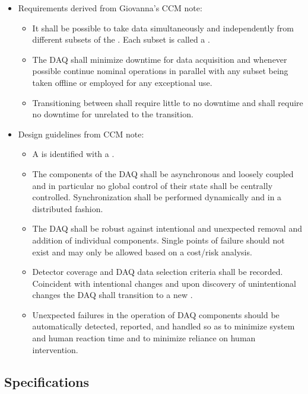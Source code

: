 \begin{itemize}
\item Requirements derived from Giovanna's CCM note:
  \begin{itemize}
  \item It shall be possible to take data simultaneously and independently from different subsets of the .  Each subset is called a .
  \item The DAQ shall minimize downtime for data acquisition and whenever possible continue nominal operations in parallel with any subset being taken offline or employed for any exceptional use.
  \item Transitioning between  shall require little to no downtime and shall require no downtime for  unrelated to the transition.  
  \end{itemize}
\item Design guidelines from CCM note:
  \begin{itemize}
  \item A  is identified with a .
  \item The components of the DAQ shall be asynchronous and loosely coupled and in particular no global control of their state shall be centrally controlled.  Synchronization shall be performed dynamically and in a distributed fashion. 
  \item The DAQ shall be robust against intentional and unexpected removal and addition of individual components. 
    Single points of failure should not exist and may only be allowed based on a cost/risk analysis.
  \item Detector coverage and DAQ data selection criteria shall be recorded.  Coincident with intentional changes and upon discovery of unintentional changes the DAQ shall transition to a new .
  \item Unexpected failures in the operation of DAQ components should be automatically detected, reported, and handled so as to minimize system and human reaction time and to minimize reliance on human intervention.
  \end{itemize}
\end{itemize}

\subsection{Specifications}
\label{sec:sd-daq:specifications}


